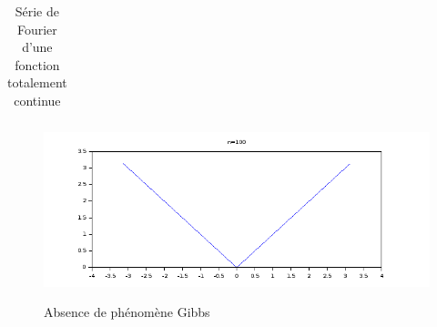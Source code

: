 \documentclass[a4paper,10pt]{report}
\begin{document}
\begin{table}[H]
\caption{Série de Fourier d'une fonction totalement continue}
\begin{tabular}{l}

\label{gibbs2}
\end{tabular}
\end{table}

\begin{figure}[H]
\centering
\caption{Absence de phénomène Gibbs}
\includegraphics[width=\textwidth]{gibbs2.png}
\label{graph_gibbs2}
\end{figure}

\newpage
\end{document}
